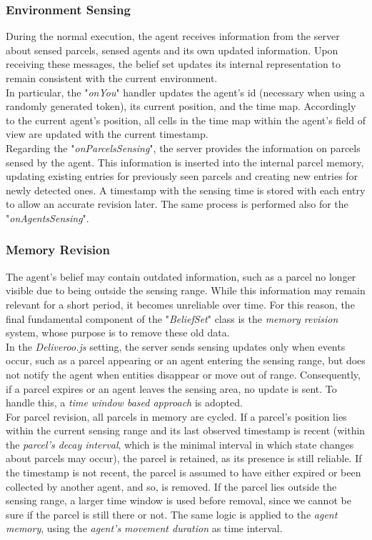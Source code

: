         \subsubsection{Environment Sensing}
            During the normal execution, the agent receives information from the server about sensed parcels, sensed agents and its own updated information. Upon receiving these messages, the belief set updates its internal representation to remain consistent with the current environment.
            \medskip\\
            In particular, the "\textit{onYou}" handler updates the agent's id (necessary when using a randomly generated token), its current position, and the time map. Accordingly to the current agent's position, all cells in the time map within the agent's field of view are updated with the current timestamp.
            \medskip\\
            Regarding the "\textit{onParcelsSensing}", the server provides the information on parcels sensed by the agent. This information is inserted into the internal parcel memory, updating existing entries for previously seen parcels and creating new entries for newly detected ones. A timestamp with the sensing time is stored with each entry to allow an accurate revision later. The same process is performed also for the "\textit{onAgentsSensing}".

        \subsubsection{Memory Revision}\label{memoryRevision}
            The agent's belief may contain outdated information, such as a parcel no longer visible due to being outside the sensing range. While this information may remain relevant for a short period, it becomes unreliable over time. For this reason, the final fundamental component of the "\textit{BeliefSet}" class is the \textit{memory revision} system, whose purpose is to remove these old data.
            \medskip\\
            In the \textit{Deliveroo.js} setting, the server sends sensing updates only when events occur, such as a parcel appearing or an agent entering the sensing range, but does not notify the agent when entities disappear or move out of range. Consequently, if a parcel expires or an agent leaves the sensing area, no update is sent. To handle this, a \textit{time window based approach} is adopted.
            \medskip\\
            For parcel revision, all parcels in memory are cycled. If a parcel's position lies within the current sensing range and its last observed timestamp is recent (within the \textit{parcel's decay interval}, which is the minimal interval in which state changes about parcels may occur), the parcel is retained, as its presence is still reliable. If the timestamp is not recent, the parcel is assumed to have either expired or been collected by another agent, and so, is removed. If the parcel lies outside the sensing range, a larger time window is used before removal, since we cannot be sure if the parcel is still there or not. The same logic is applied to the \textit{agent memory}, using the \textit{agent's movement duration} as time interval.

